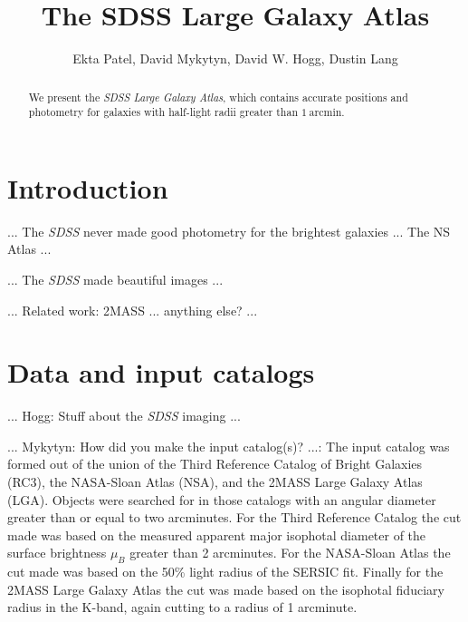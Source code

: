 \documentclass[12pt,preprint,dvipdf]{aastex}
\newcounter{address}
\newcommand{\project}[1]{\textsl{#1}}
\newcommand{\units}[1]{\mathrm{#1}}
\renewcommand{\arcmin}{\units{arcmin}}
\begin{document}
\title{
       The SDSS Large Galaxy Atlas
      }
\author{
        Ekta Patel\altaffilmark{\ref{CCPP}},
        David Mykytyn\altaffilmark{\ref{CCPP}},
        David W. Hogg\altaffilmark{\ref{CCPP},\ref{MPIA},\ref{email}},
        Dustin Lang\altaffilmark{\ref{CMU}}
       }
\setcounter{address}{1}

\begin{abstract}
We present the \project{SDSS Large Galaxy Atlas}, which contains
accurate positions and photometry for galaxies with half-light radii
greater than $1~\arcmin$.
\end{abstract}

\section{Introduction}

... The \project{SDSS} never made good photometry for the brightest galaxies ... The NS Atlas ...

... The \project{SDSS} made beautiful images ...

... Related work:  2MASS ... anything else? ...

\section{Data and input catalogs}

... Hogg: Stuff about the \project{SDSS} imaging ...

... Mykytyn: How did you make the input catalog(s)? ...:  The input catalog was formed out of the union of the Third Reference Catalog of Bright Galaxies (RC3), the NASA-Sloan Atlas (NSA), and the 2MASS Large Galaxy Atlas (LGA). Objects were searched for in those catalogs with an angular diameter greater than or equal to two arcminutes. For the Third Reference Catalog the cut made was based on the measured apparent major isophotal diameter of the surface brightness $\mu_{B}$ greater than 2 arcminutes. For the NASA-Sloan Atlas the cut made was based on the 50\% light radius of the SERSIC fit. Finally for the 2MASS Large Galaxy Atlas the cut was made based on the isophotal fiduciary radius in the K-band, again cutting to a radius of 1 arcminute.
\end{document}
